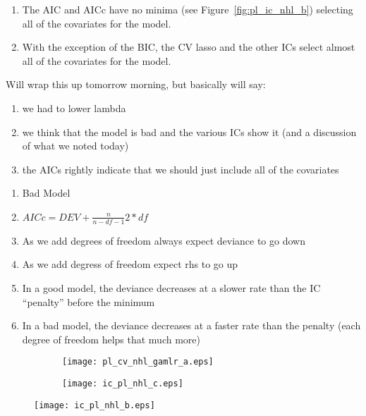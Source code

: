 \documentclass[11pt, fleqn]{article}
\begin{document}
\begin{enumerate}
  \item The AIC and AICc have no minima (see Figure~\vref{fig:pl_ic_nhl_b}) selecting all of the covariates for the model.
  \item With the exception of the BIC, the CV lasso and the other ICs select almost all of the covariates for the model.
\end{enumerate}

Will wrap this up tomorrow morning, but basically will say:
\begin{enumerate}
  \item we had to lower lambda
  \item we think that the model is bad and the various ICs show it (and a discussion of what we noted today)
  \item the AICs rightly indicate that we should just include all of the covariates
\end{enumerate}

\begin{enumerate}
  \item Bad Model
  \item $AICc = DEV + \frac{n}{n-df-1}2*df$
  \item As we add degrees of freedom always expect deviance to go down
  \item As we add degress of freedom expect rhs to go up
  \item In a good model, the deviance decreases at a slower rate than the IC ``penalty'' before the minimum
  \item In a bad model, the deviance decreases at a faster rate than the penalty (each degree of freedom helps that much more)
\end{enumerate}

\begin{figure}
  \centering
  \begin{subfigure}[b]{0.49\textwidth}
    \texttt{[image: pl\_cv\_nhl\_gamlr\_a.eps]}
    \caption{}
    \label{fig:pl_cv_nhl}
  \end{subfigure}
  \hfill
  \begin{subfigure}[b]{0.49\textwidth}
    \texttt{[image: ic\_pl\_nhl\_c.eps]}
    \caption{}
    \label{fig:pl_ic_nhl}
  \end{subfigure}
  \caption{}
\end{figure}

\begin{figure}[!htb]
  \centering
  \texttt{[image: ic\_pl\_nhl\_b.eps]}
  \caption{}
  \label{fig:pl_ic_nhl_b}
\end{figure}



\end{document}
